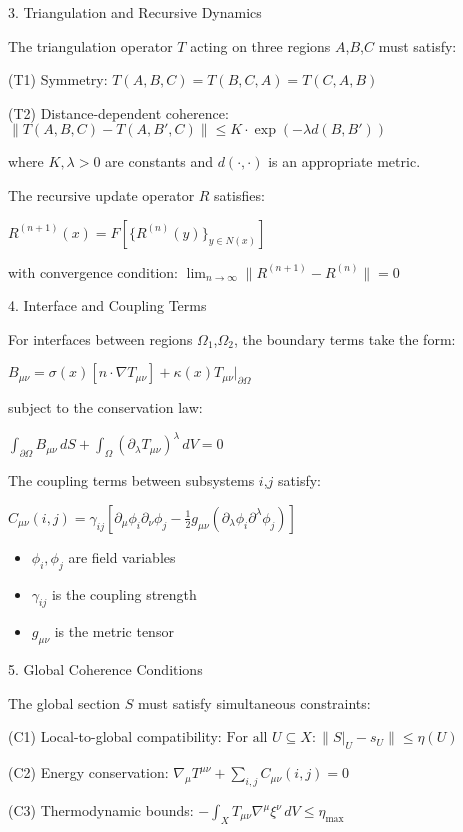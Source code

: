 3. Triangulation and Recursive Dynamics

The triangulation operator $T$ acting on three regions $A$,$B$,$C$ must satisfy:

(T1) Symmetry: $T(A,B,C) = T(B,C,A) = T(C,A,B)$

(T2) Distance-dependent coherence:
$\|T(A,B,C) - T(A,B',C)\| \leq K \cdot \exp(-\lambda d(B,B'))$

where $K,\lambda > 0$ are constants and $d(\cdot,\cdot)$ is an appropriate metric.

The recursive update operator $R$ satisfies:

$R^{(n+1)}(x) = F[\{R^{(n)}(y)\}_{y \in N(x)}]$

with convergence condition:
$\lim_{n \rightarrow \infty} \|R^{(n+1)} - R^{(n)}\| = 0$

4. Interface and Coupling Terms

For interfaces between regions $\Omega_1$,$\Omega_2$, the boundary terms take the form:

$B_{\mu\nu} = \sigma(x)[n \cdot \nabla T_{\mu\nu}] + \kappa(x)T_{\mu\nu}|_{\partial\Omega}$

subject to the conservation law:

$\int_{\partial\Omega} B_{\mu\nu} \,dS + \int_\Omega (\partial_\lambda T_{\mu\nu})^\lambda \,dV = 0$

The coupling terms between subsystems $i$,$j$ satisfy:

$C_{\mu\nu}(i,j) = \gamma_{ij}[\partial_\mu\phi_i\partial_\nu\phi_j - \tfrac{1}{2}g_{\mu\nu}(\partial_\lambda\phi_i\partial^\lambda\phi_j)]$

\begin{itemize}
\item $\phi_i,\phi_j$ are field variables
\item $\gamma_{ij}$ is the coupling strength
\item $g_{\mu\nu}$ is the metric tensor
\end{itemize}

5. Global Coherence Conditions

The global section $S$ must satisfy simultaneous constraints:

(C1) Local-to-global compatibility:
$\text{For all } U \subseteq X: \|S|_U - s_U\| \leq \eta(U)$

(C2) Energy conservation:
$\nabla_\mu T^{\mu\nu} + \sum_{i,j} C_{\mu\nu}(i,j) = 0$

(C3) Thermodynamic bounds:
$-\int_X T_{\mu\nu}\nabla^\mu\xi^\nu \,dV \leq \eta_{\text{max}}$

